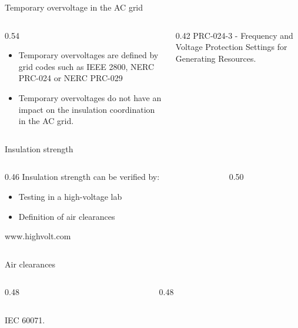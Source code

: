 \begin{frame}{Temporary overvoltage in the AC grid}
  \begin{columns}[c,onlytextwidth]
    \begin{column}{0.54\textwidth}
      \begin{itemize}
        \setlength{\itemsep}{0.5em}
        \item Temporary overvoltages are defined by grid codes such as IEEE 2800, NERC PRC-024 or NERC PRC-029
        \item Temporary overvoltages do not have an impact on the insulation coordination in the AC grid.
      \end{itemize}
      \vspace{0.3em}
    \end{column}
    \begin{column}{0.42\textwidth}
      \centering
      {\color{atGray}\footnotesize PRC-024-3 - Frequency and Voltage Protection Settings for Generating Resources.}
    \end{column}
  \end{columns}
\end{frame}

\begin{frame}{Insulation strength}
  \begin{columns}[c,onlytextwidth]
    \begin{column}{0.46\textwidth}
      Insulation strength can be verified by:
      \begin{itemize}
        \setlength{\itemsep}{0.4em}
        \item Testing in a high-voltage lab
        \item Definition of air clearances
      \end{itemize}
      \vspace{0.3em}
      {\color{atGray}\footnotesize www.highvolt.com}
    \end{column}
    \begin{column}{0.50\textwidth}
      \centering
    \end{column}
  \end{columns}
\end{frame}

\begin{frame}{Air clearances}
  \begin{columns}[c,onlytextwidth]
    \begin{column}{0.48\textwidth}
      \centering
    \end{column}
    \begin{column}{0.48\textwidth}
      \centering
    \end{column}
  \end{columns}
  \vspace{0.3em}
  {\color{atGray}\footnotesize IEC 60071.}
\end{frame}

